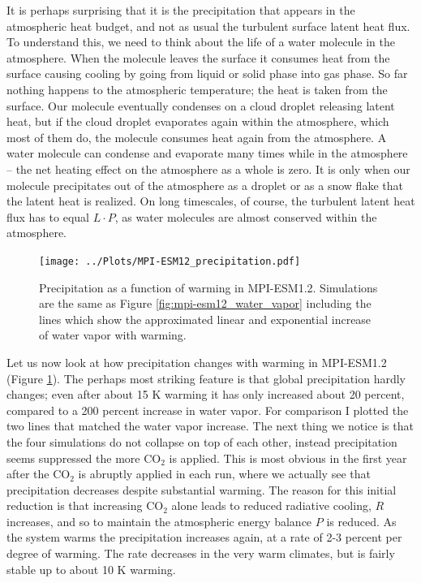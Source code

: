 \documentclass[12pt]{book}
\begin{document}
It is perhaps surprising that it is the precipitation that appears in the atmospheric heat budget, and not as usual the turbulent surface latent heat flux. To understand this, we need to think about the life of a water molecule in the atmosphere. When the molecule leaves the surface it consumes heat from the surface causing cooling by going from liquid or solid phase into gas phase. So far nothing happens to the atmospheric temperature; the heat is taken from the surface. Our molecule eventually condenses on a cloud droplet releasing latent heat, but if the cloud droplet evaporates again within the atmosphere, which most of them do, the molecule consumes heat again from the atmosphere. A water molecule can condense and evaporate many times while in the atmosphere -- the net heating effect on the atmosphere as a whole is zero. It is only when our molecule precipitates out of the atmosphere as a droplet or as a snow flake that the latent heat is realized. On long timescales, of course, the turbulent latent heat flux has to equal $L\cdot P$, as water molecules are almost conserved within the atmosphere.

\begin{figure}
\begin{center}
\texttt{[image: ../Plots/MPI-ESM12\_precipitation.pdf]}
\end{center}
\caption{ Precipitation as a function of warming in MPI-ESM1.2. Simulations are the same as Figure \ref{fig:mpi-esm12_water_vapor} including the lines which show the approximated linear and exponential increase of water vapor with warming. } 
\label{fig:mpi-esm12_precipitation}
\end{figure}

Let us now look at how precipitation changes with warming in MPI-ESM1.2 (Figure \ref{fig:mpi-esm12_precipitation}). The perhaps most striking feature is that global precipitation hardly changes; even after about 15 K warming it has only increased about 20 percent, compared to a 200 percent increase in water vapor. For comparison I plotted the two lines that matched the water vapor increase. The next thing we notice is that the four simulations do not collapse on top of each other, instead precipitation seems suppressed the more CO$_2$ is applied. This is most obvious in the first year after the CO$_2$ is abruptly applied in each run, where we actually see that precipitation decreases despite substantial warming. The reason for this initial reduction is that increasing CO$_2$ alone leads to reduced radiative cooling, $R$ increases, and so to maintain the atmospheric energy balance $P$ is reduced. As the system warms the precipitation increases again, at a rate of 2-3 percent per degree of warming. The rate decreases in the very warm climates, but is fairly stable up to about 10 K warming.
\end{document}
